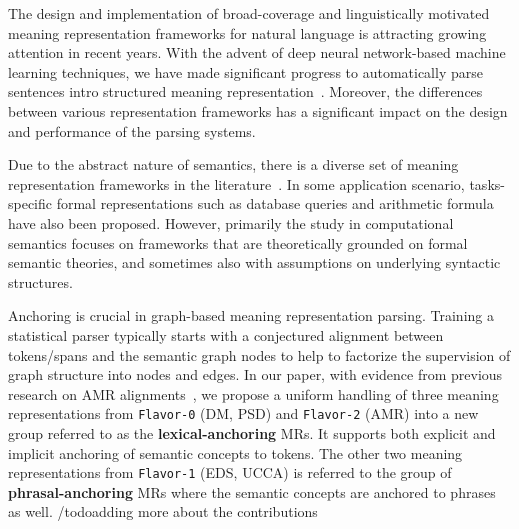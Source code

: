 The design and implementation of broad-coverage and linguistically
motivated meaning representation frameworks for natural language is
attracting growing attention in recent years. With the advent of deep
neural network-based machine learning techniques, we have made
significant progress to automatically parse sentences intro structured
meaning representation~\cite{Oep:Kuh:Miy:14,Oep:Kuh:Miy:15,May:2016wc,hershcovich-etal-2019-semeval}. Moreover,
the differences between various representation frameworks has a
significant impact on the design and performance of the parsing
systems.

Due to the abstract nature of semantics, there is a diverse set of
meaning representation frameworks in the literature~\cite{abend2017state}. In some
application scenario, tasks-specific formal representations such as
database queries and arithmetic formula have also been proposed. However,
primarily the study in computational semantics focuses on frameworks
that are theoretically grounded on formal semantic theories, and
sometimes also with assumptions on underlying syntactic structures.

Anchoring is crucial in graph-based meaning representation
parsing. Training a statistical parser typically starts with a
conjectured alignment between tokens/spans and the semantic graph
nodes to help to factorize the supervision of graph structure into
nodes and edges. In our paper, with evidence from previous research on
AMR
alignments~\cite{Pourdamghani:2014aligning,Flanigan:2014vc,Wang:2017vt,chen2017unsupervised,szubert2018structured,lyu2018amr}, we propose a uniform handling of three meaning
representations from \texttt{Flavor-0} (DM, PSD) and \texttt{Flavor-2}
(AMR) into a new group referred to as the \textbf{lexical-anchoring}
MRs. It supports both explicit and implicit anchoring of semantic
concepts to tokens.  The other two meaning representations from
\texttt{Flavor-1} (EDS, UCCA) is referred to the group of
\textbf{phrasal-anchoring} MRs where the semantic concepts are
anchored to phrases as well.
/todo{adding more about the contributions}
%
